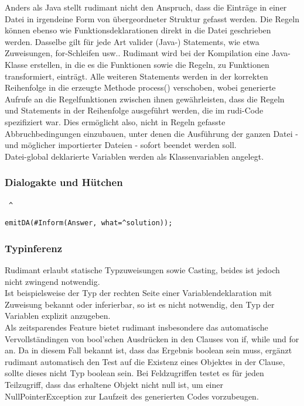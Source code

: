 Anders als Java stellt rudimant nicht den Anspruch, dass die Einträge in einer Datei in irgendeine Form von übergeordneter Struktur gefasst werden. Die Regeln können ebenso wie Funktionsdeklarationen direkt in die Datei geschrieben werden. Dasselbe gilt für jede Art valider (Java-) Statements, wie etwa Zuweisungen, for-Schleifen usw.. Rudimant wird bei der Kompilation eine Java-Klasse erstellen, in die es die Funktionen sowie die Regeln, zu Funktionen transformiert, einträgt. Alle weiteren Statements werden in der korrekten Reihenfolge in die erzeugte Methode process() verschoben, wobei generierte Aufrufe an die Regelfunktionen zwischen ihnen gewährleisten, dass die Regeln und Statements in der Reihenfolge ausgeführt werden, die im rudi-Code spezifiziert war. Dies ermöglicht also, nicht in Regeln gefasste Abbruchbedingungen einzubauen, unter denen die Ausführung der ganzen Datei - und möglicher importierter Dateien - sofort beendet werden soll.\\
Datei-global deklarierte Variablen werden als Klassenvariablen angelegt.

\subsubsection{Dialogakte und Hütchen} \ {\Large\verb|^|}

\begin{verbatim}
emitDA(#Inform(Answer, what=^solution));
\end{verbatim}

\subsubsection{Typinferenz} \label{rudimant-Typinferenz}

Rudimant erlaubt statische Typzuweisungen sowie Casting, beides ist jedoch nicht zwingend notwendig.\\
Ist beispielsweise der Typ der rechten Seite einer Variablendeklaration mit Zuweisung bekannt oder inferierbar, so ist es nicht notwendig, den Typ der Variablen explizit anzugeben.\\
Als zeitsparendes Feature bietet rudimant insbesondere das automatische Vervollständingen von bool'schen Ausdrücken in den Clauses von if, while und for an. Da in diesem Fall bekannt ist, dass das Ergebnis boolean sein muss, ergänzt rudimant automatisch den Test auf die Existenz eines Objektes in der Clause, sollte dieses nicht Typ boolean sein. Bei Feldzugriffen testet es für jeden Teilzugriff, dass das erhaltene Objekt nicht null ist, um einer NullPointerException zur Laufzeit des generierten Codes vorzubeugen.

